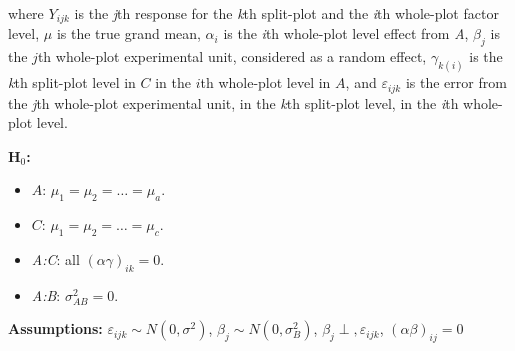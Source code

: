 \documentclass[12pt,english]{article}\usepackage[]{graphicx}\usepackage[table]{xcolor}
\begin{document}
\noindent where $Y_{ijk}$ is the \textit{j}th response for the \textit{k}th split-plot and the \textit{i}th whole-plot factor level, $\mu$ is the true grand mean, $\alpha_i$ is the \textit{i}th whole-plot level effect from \textit{A}, $\beta_j$ is the $j$th whole-plot experimental unit, considered as a random effect, $\gamma_{k(i)}$ is the \textit{k}th split-plot level in $C$ in the $i$th whole-plot level in $A$, and $\varepsilon_{ijk}$ is the error from the \textit{j}th whole-plot experimental unit, in the \textit{k}th split-plot level, in the \textit{i}th whole-plot level. \\
\vspace{0.05in}

\noindent \textbf{H$_0$:}
\begin{itemize}
\item $A$: $\mu_1 = \mu_2 = \dots = \mu_a$.
\item $C$: $\mu_1 = \mu_2 = \dots = \mu_c$.
\item \textit{A:C}: all $(\alpha\gamma)_{ik} = 0$.
\item \textit{A:B}: $\sigma^2_{AB} = 0$.
\end{itemize}
\vspace{0.1in}

\noindent \textbf{Assumptions:} $\varepsilon_{ijk} \sim N(0, \sigma^2)$, \hspace{0.1in} $\beta_{j} \sim N(0, \sigma_B^2)$, \hspace{0.1in} $\beta_{j} \perp , \varepsilon_{ijk}$, \hspace{0.1in} $(\alpha\beta)_{ij} = 0$
\vspace{0.1in}
\end{document}
